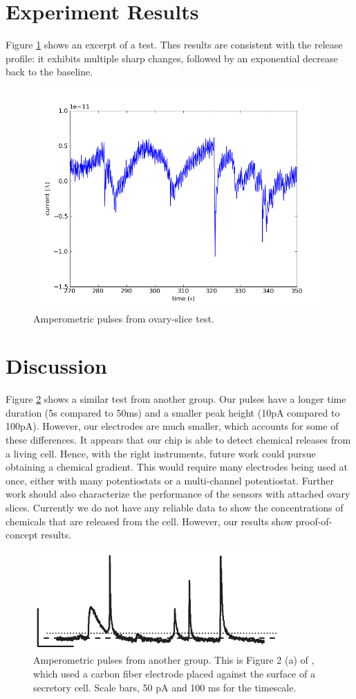 \section{Experiment Results}

Figure \ref{216} shows an excerpt of a test. Thes results are consistent with the release profile: it exhibits multiple sharp changes, followed by an exponential decrease back to the baseline.

\begin{figure}
	\centering
	\includegraphics[width=0.7\linewidth]{figures/216.png}
	\caption{Amperometric pulses from ovary-slice test.}
	\label{216}
\end{figure}

\section{Discussion}

Figure \ref{mosharok-pulses} shows a similar test from another group. Our pulses have a longer time duration (5s compared to 50ms) and a smaller peak height (10pA compared to 100pA). However, our electrodes are much smaller, which accounts for some of these differences. It appears that our chip is able to detect chemical releases from a living cell. Hence, with the right instruments, future work could pursue obtaining a chemical gradient. This would require many electrodes being used at once, either with many potentiostats or a multi-channel potentiostat. Further work should also characterize the performance of the sensors with attached ovary slices. Currently we do not have any reliable data to show the concentrations of chemicals that are released from the cell. However, our results show proof-of-concept results.

\begin{figure}
	\centering
	\includegraphics[width=0.5\linewidth]{figures/mosharok-pulse.png}
	\caption[Amperometric pulses from another group]{Amperometric pulses from another group. This is Figure 2 (a) of \cite{mosharok2005aee}, which used a carbon fiber electrode placed against the surface of a secretory cell. Scale bars, 50 pA and 100 ms for the timescale.}
	\label{mosharok-pulses}
\end{figure}
